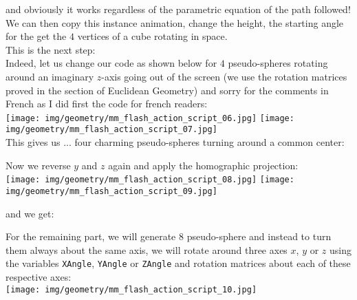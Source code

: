 	\begin{tcolorbox}[colframe=black,colback=white,sharp corners]
	and obviously it works regardless of the parametric equation of the path followed! We can then copy this instance animation, change the height, the starting angle for the get the $4$ vertices of a cube rotating in space.\\

	This is the next step:\\

	Indeed, let us change our code as shown below for $4$ pseudo-spheres rotating around an imaginary $z$-axis going out of the screen (we use the rotation matrices proved in the section of Euclidean Geometry) and sorry for the comments in French as I did first the code for french readers:\\
	
	\texttt{[image: img/geometry/mm\_flash\_action\_script\_06.jpg]}
	\texttt{[image: img/geometry/mm\_flash\_action\_script\_07.jpg]}\\
	
	This gives us ... four charming pseudo-spheres turning around a common center:
	\end{tcolorbox}
	
	\pagebreak
	\begin{tcolorbox}[colframe=black,colback=white,sharp corners]
	\begin{center}
	\centering
	\end{center}
	Now we reverse $y$ and $z$ again and apply the homographic projection:\\
	
	\texttt{[image: img/geometry/mm\_flash\_action\_script\_08.jpg]}
	\texttt{[image: img/geometry/mm\_flash\_action\_script\_09.jpg]}
	\end{tcolorbox}
	
	
	\begin{tcolorbox}[colframe=black,colback=white,sharp corners]
	and we get:
	\begin{center}
	\centering
	\end{center}
	For the remaining part, we will generate $8$ pseudo-sphere and instead to turn them always about the same axis, we will rotate around three axes $x$, $y$ or $z$ using the variables \texttt{XAngle}, \texttt{YAngle} or \texttt{ZAngle} and rotation matrices about each of these respective axes:\\
	
	\texttt{[image: img/geometry/mm\_flash\_action\_script\_10.jpg]}
	\end{tcolorbox}
	
